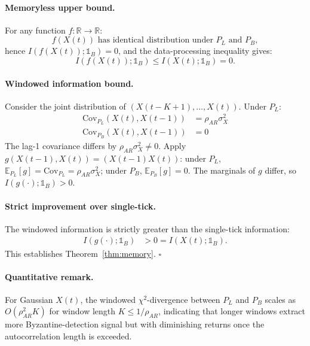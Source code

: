 \paragraph{Memoryless upper bound.} For any function
$f: \mathbb{R} \to \mathbb{R}$:
\begin{equation}
  f(X(t)) \text{ has identical distribution under } P_L \text{ and } P_B,
\end{equation}
hence $I(f(X(t)); \mathbb{1}_B) = 0$, and the data-processing
inequality gives:
\begin{equation}
  I(f(X(t)); \mathbb{1}_B) \le I(X(t); \mathbb{1}_B) = 0.
\end{equation}

\paragraph{Windowed information bound.} Consider the joint distribution
of $(X(t-K+1), \ldots, X(t))$. Under $P_L$:
\begin{align}
  \mathrm{Cov}_{P_L}(X(t), X(t-1)) &= \rho_{AR} \sigma_X^2 \\
  \mathrm{Cov}_{P_B}(X(t), X(t-1)) &= 0
\end{align}
The lag-1 covariance differs by $\rho_{AR} \sigma_X^2 \ne 0$. Apply
$g(X(t-1), X(t)) = (X(t-1) X(t))$: under $P_L$, $\mathbb{E}_{P_L}[g] =
\mathrm{Cov}_{P_L} = \rho_{AR}\sigma_X^2$; under $P_B$,
$\mathbb{E}_{P_B}[g] = 0$. The marginals of $g$ differ, so
$I(g(\cdot); \mathbb{1}_B) > 0$.

\paragraph{Strict improvement over single-tick.} The windowed
information is strictly greater than the single-tick information:
\begin{align}
  I(g(\cdot); \mathbb{1}_B) &> 0 = I(X(t); \mathbb{1}_B).
\end{align}
This establishes Theorem~\ref{thm:memory}. $\square$

\paragraph{Quantitative remark.} For Gaussian $X(t)$, the windowed
$\chi^2$-divergence between $P_L$ and $P_B$ scales as
$O(\rho_{AR}^2 K)$ for window length $K \le 1/\rho_{AR}$, indicating
that longer windows extract more Byzantine-detection signal but with
diminishing returns once the autocorrelation length is exceeded.

